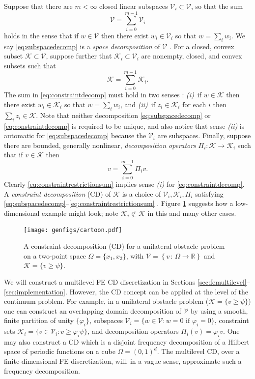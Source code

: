 \documentclass[review,hidelinks,onefignum,onetabnum]{siamart220329}
\newcommand{\RR}{\mathbb{R}}
\newcommand{\cK}{\mathcal{K}}
\newcommand{\cV}{\mathcal{V}}
\begin{document}
Suppose that there are $m<\infty$ closed linear subspaces $\cV_i \subset \cV$, so that the sum
\begin{equation}
\cV = \sum_{i=0}^{m-1} \cV_i \label{eq:subspacedecomp}
\end{equation}
holds in the sense that if $w \in \cV$ then there exist $w_i \in \cV_i$ so that $w = \sum_i w_i$.  We say \eqref{eq:subspacedecomp} is a \emph{space decomposition} of $\cV$ \cite{Xu1992}.  For a closed, convex subset $\cK \subset \cV$, suppose further that $\cK_i \subset \cV_i$ are nonempty, closed, and convex subsets such that
\begin{equation}
\cK = \sum_{i=0}^{m-1} \cK_i. \label{eq:constraintdecomp}
\end{equation}
The sum in \eqref{eq:constraintdecomp} must hold in two senses \cite{TaiTseng2002}: \emph{(i)}~if $w \in \cK$ then there exist $w_i \in \cK_i$ so that $w = \sum_i w_i$, and \emph{(ii)}~if $z_i \in \cK_i$ for each $i$ then $\sum_i z_i \in \cK$.  Note that neither decomposition \eqref{eq:subspacedecomp} or \eqref{eq:constraintdecomp} is required to be unique, and also notice that sense \emph{(ii)} is automatic for \eqref{eq:subspacedecomp} because the $\cV_i$ are subspaces.  Finally, suppose there are bounded, generally nonlinear, \emph{decomposition operators} $\Pi_i : \cK \to \cK_i$ such that if $v \in \cK$ then
\begin{equation}
v = \sum_{i=0}^{m-1} \Pi_i v.  \label{eq:constraintrestrictionsum}
\end{equation}
Clearly \eqref{eq:constraintrestrictionsum} implies sense \emph{(i)} for \eqref{eq:constraintdecomp}.  A \emph{constraint decomposition} (CD) of $\cK$ is a choice of $\cV_i,\cK_i,\Pi_i$ satisfying \eqref{eq:subspacedecomp}--\eqref{eq:constraintrestrictionsum} \cite{Tai2003}.  Figure \ref{fig:cartoon} suggests how a low-dimensional example might look; note $\cK_i \not\subset \cK$ in this and many other cases.

\begin{figure}[ht]
\centering
\texttt{[image: genfigs/cartoon.pdf]}
\caption{A constraint decomposition (CD) for a unilateral obstacle problem on a two-point space $\Omega=\{x_1,x_2\}$, with $\mathcal{V}=\left\{v \,:\, \Omega \to \RR\right\}$ and $\mathcal{K}=\{v\ge \psi\}$.}
\label{fig:cartoon}
\end{figure}

We will construct a multilevel FE CD discretization in Sections \ref{sec:femultilevel}--\ref{sec:implementation}.  However, the CD concept can be applied at the level of the continuum problem.  For example, in a unilateral obstacle problem ($\cK = \{v \ge \psi\}$) one can construct an overlapping domain decomposition of $\cV$ by using a smooth, finite partition of unity $\{\varphi_i\}$, subspaces $\cV_i = \{w \in \cV : w = 0 \text{ if } \varphi_i = 0\}$, constraint sets $\cK_i = \{v \in \cV_i : v \ge \varphi_i \psi\}$, and decomposition operators $\Pi_i(v) = \varphi_i v$.  One may also construct a CD which is a disjoint frequency decomposition of a Hilbert space of periodic functions on a cube $\Omega=(0,1)^d$.  The multilevel CD, over a finite-dimensional FE discretization, will, in a vague sense, approximate such a frequency decomposition.
\end{document}
